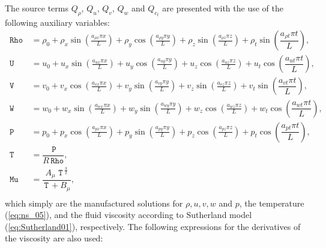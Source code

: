 \documentclass[10pt]{article}
\newcommand{\Rho}{\,\mathtt{Rho}}
\newcommand{\PP}{\,\mathtt{P}}
\newcommand{\U}{\,\mathtt{U}}
\newcommand{\V}{\,\mathtt{V}}
\newcommand{\W}{\,\mathtt{W}}
\newcommand{\Mu}{\,\mathtt{Mu}}
\newcommand{\T}{\,\mathtt{T}\,}
\begin{document}
The source terms $Q_\rho$, $Q_u$, $Q_v$, $Q_w$ and $Q_{e_t}$ are  presented with the use of the following auxiliary variables:\begin{equation}
 \begin{split}
\label{eq:aux_01}
\Rho \, &= \rho_{0}+ \rho_{x} \sin\left(\frac{a_{ \rho  x} \pi x}{L}\right)+ \rho_{y} \cos\left(\frac{a_{ \rho  y} \pi y}{L}\right) + \rho_{z} \sin\left(\frac{a_{ \rho  z} \pi z}{L}\right)+ \rho_t \sin\left(\dfrac{a_{\rho t} \pi t}{L}\right),\\
\U&=u_{0}+u_{x} \sin\left(\frac{a_{u  x} \pi x}{L}\right)+u_{y} \cos\left(\frac{a_{u  y} \pi y}{L}\right)+u_{z} \cos\left(\frac{a_{u  z} \pi z}{L}\right) + u_t \cos\left(\dfrac{a_{u t} \pi t}{L}\right) ,\\
\V \, &= v_{0}+v_{x} \cos\left(\frac{a_{v  x} \pi x}{L}\right)+v_{y} \sin\left(\frac{a_{v  y} \pi y}{L}\right)+v_{z} \sin\left(\frac{a_{v  z} \pi z}{L}\right)+ v_t \sin\left(\dfrac{a_{v t} \pi t}{L}\right), \\
\W \, &= w_{0}+w_{x} \sin\left(\frac{a_{w  x} \pi x}{L}\right)+w_{y} \sin\left(\frac{a_{w  y} \pi y}{L}\right)+ w_{z} \cos\left(\frac{a_{w  z} \pi z}{L}\right) + w_t \cos\left(\dfrac{a_{w t} \pi t}{L}\right),\\
\PP \, &= p_{0}+p_{x} \cos\left(\frac{a_{p  x} \pi x}{L}\right)+p_{y} \sin\left(\frac{a_{p  y} \pi y}{L}\right)+ p_{z} \cos\left(\frac{a_{p  z} \pi z}{L}\right)+ p_t \cos\left(\dfrac{a_{p t} \pi t}{L}\right),\\
\T&= \dfrac{\PP}{R\Rho},\\
\Mu  &=\dfrac{A_\mu \, \T^{\frac{3}{2}}}{\T+B_\mu},\\
\end{split}
\end{equation}
which simply are the manufactured solutions for $\rho, u, v, w$ and $p$, the temperature (\ref{eq:ns_05}), and  the fluid viscosity according to Sutherland model (\ref{eq:Sutherland01}), respectively. The following expressions for the derivatives of the viscosity are also used:
\end{document}
